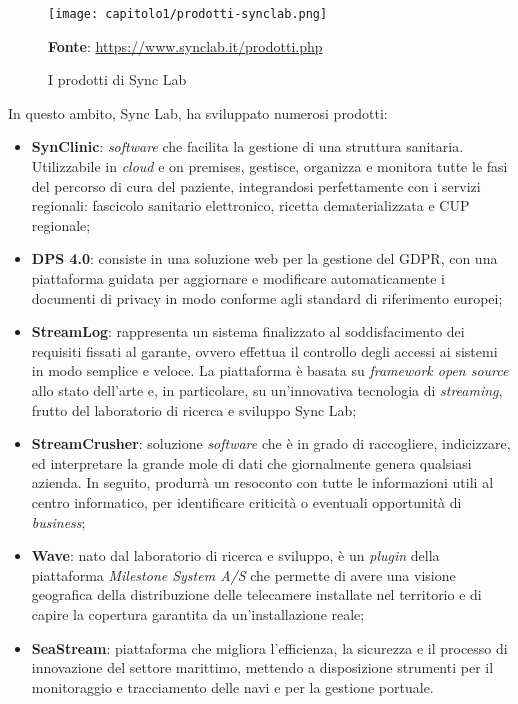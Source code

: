 \begin{figure}[!h]
  \centering
  \texttt{[image: capitolo1/prodotti-synclab.png]}
  \caption{I prodotti di Sync Lab}
  \textbf{Fonte}: \href{https://www.synclab.it/prodotti.php}{https://www.synclab.it/prodotti.php}
\end{figure}

\noindent In questo ambito, Sync Lab, ha sviluppato numerosi prodotti:
\begin{itemize}
  \item \textbf{SynClinic}: \textit{software} che facilita la gestione di una struttura sanitaria. Utilizzabile in \textit{cloud} e \gls{on premises}, gestisce, organizza e monitora tutte le fasi del percorso di cura del paziente, integrandosi perfettamente con i servizi regionali: fascicolo sanitario elettronico, ricetta dematerializzata e CUP regionale;
  
  \item \textbf{DPS 4.0}: consiste in una soluzione web per la gestione del GDPR, con una piattaforma guidata per aggiornare e modificare automaticamente i documenti di privacy in modo conforme agli standard di riferimento europei;
  
  \item \textbf{StreamLog}: rappresenta un sistema finalizzato al soddisfacimento dei requisiti fissati al garante, ovvero effettua il controllo degli accessi ai sistemi in modo semplice e veloce. La piattaforma è basata su \textit{framework open source} allo stato dell'arte e, in particolare, su un'innovativa tecnologia di \textit{streaming}, frutto del laboratorio di ricerca e sviluppo Sync Lab;
  
  \item \textbf{StreamCrusher}: soluzione \textit{software} che è in grado di raccogliere, indicizzare, ed interpretare la grande mole di dati che giornalmente genera qualsiasi azienda. In seguito, produrrà un resoconto con tutte le informazioni utili al centro informatico, per identificare criticità o eventuali opportunità di \textit{business};
  
  \item \textbf{Wave}: nato dal laboratorio di ricerca e sviluppo, è un \textit{plugin} della piattaforma \textit{Milestone System A/S} che permette di avere una visione geografica della distribuzione delle telecamere installate nel territorio e di capire la copertura garantita da un'installazione reale;
  
  \item \textbf{SeaStream}: piattaforma che migliora l'efficienza, la sicurezza e il processo di innovazione del settore marittimo, mettendo a disposizione strumenti per il monitoraggio e tracciamento delle navi e per la gestione portuale.  
\end{itemize}

